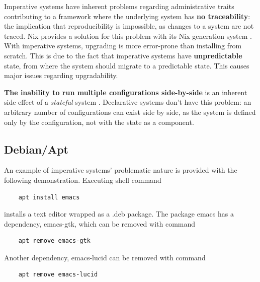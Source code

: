 Imperative systems have inherent problems regarding
administrative traits contributing to a framework where the underlying
system has \textbf{no traceability}: the implication that
reproducibility is impossible, as changes to a system are not
traced. Nix provides a solution for this problem with its Nix
generation system \cite{dolstra2007purely}. With
imperative systems, upgrading is more error-prone than installing from
scratch. This is due to the fact that imperative systems have
\textbf{unpredictable} state, from where the system should migrate to
a predictable state. This causes major issues regarding
upgradability. 

\textbf{The inability to run multiple configurations side-by-side} is
an inherent side effect of a \textit{stateful} system \cite{dolstra2007purely}. Declarative
systems don't have this problem: an arbitrary number of configurations
can exist side by side, as the system is defined only by the
configuration, not with the state as a
component. 

\subsection{Debian/Apt} \label{debian/apt}

An example of imperative systems' problematic nature is provided with
the following demonstration. Executing shell command
\begin{lstlisting}
    apt install emacs
\end{lstlisting}
installs a text editor wrapped as a .deb package.  The package emacs
has a dependency, emacs-gtk, which can be removed with command
\begin{lstlisting}
    apt remove emacs-gtk
\end{lstlisting}
Another dependency, emacs-lucid can be removed with command
\begin{lstlisting}
    apt remove emacs-lucid
\end{lstlisting}

